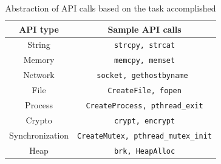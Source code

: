 \begin{table}[t]
\caption{Abstraction of API calls based on the task accomplished}\label{tab:lib-cat}
\begin{center}
{\scriptsize
\begin{tabular}{|c|c|}
  \hline
  \textbf{API type} & \textbf{Sample API calls} \\
  \hline
  String & \texttt{strcpy, strcat}\\
  \hline
  Memory  & \texttt{memcpy, memset} \\
  \hline
  Network & \texttt{socket, gethostbyname }\\
  \hline
   File & \texttt{CreateFile, fopen}\\
  \hline
  Process  & \texttt{CreateProcess, pthread\_exit} \\
  \hline
 Crypto & \texttt{crypt, encrypt}\\
  \hline
  Synchronization  & \texttt{CreateMutex, pthread\_mutex\_init} \\
  \hline
  Heap & \texttt{brk, HeapAlloc}\\
  \hline
  \end{tabular}
}
\end{center}
\end{table}


